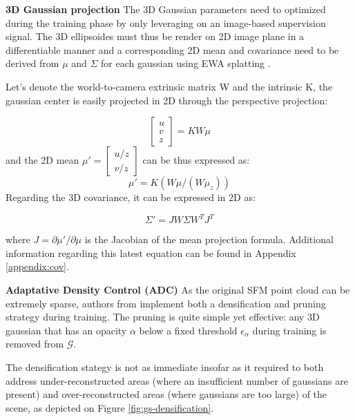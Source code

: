\noindent \textbf{3D Gaussian projection} The 3D Gaussian parameters need to optimized during the training phase by only leveraging on an image-based supervision signal. The 3D ellipsoides must thus be render on 2D image plane in a differentiable manner and a corresponding 2D mean and covariance need to be derived from $\mu$ and $\Sigma$ for each gaussian using EWA splatting \citep{zwicker2001ewa}. 

Let's denote the world-to-camera extrinsic matrix W and the intrinsic K, the gaussian center is easily projected in 2D through the perspective projection: 

\begin{equation}
  \begin{bmatrix}
    u \\
    v \\
    z
  \end{bmatrix} = KW\mu
\end{equation}
and the 2D mean $\mu' = \begin{bmatrix}
  u/z \\
  v/z
\end{bmatrix}$ can be  thus expressed as:
\begin{equation}
  \mu' = K(W\mu/(W\mu_{z}))
\end{equation}
Regarding the 3D covariance, it can be expressed in 2D as:

\begin{equation}
  \Sigma'= JW\Sigma W^{T}J^{T}
\end{equation}

where $J = \partial \mu' / \partial \mu$ is the Jacobian of the mean projection formula. Additional information regarding this latest equation can be found in Appendix \ref{appendix:cov}. 

\noindent \textbf{Adaptative Density Control (ADC)} 
As the original \ac{SFM} point cloud can be extremely sparse, authors from \cite{kerbl20233d} implement both a densification and pruning strategy during training. The pruning is quite simple yet effective: any 3D gaussian that has an opacity $\alpha$ below a fixed threshold $\epsilon_{\alpha}$ during training is removed from $\mathcal{G}$. 

The densification stategy is not as immediate insofar as it required to both address under-reconstructed areas (where an insufficient number of gaussians are present) and over-reconstructed areas (where gaussians are too large) of the scene, as depicted on Figure \ref{fig:gs-densification}. 

